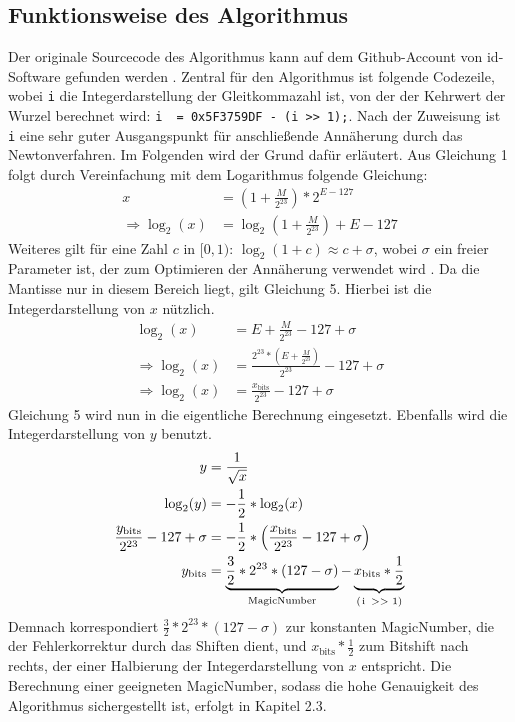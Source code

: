 \documentclass[course=erap]{aspdoc}
\begin{document}
\subsection{Funktionsweise des Algorithmus}
Der originale Sourcecode des Algorithmus kann auf dem Github-Account von id-Software gefunden werden \cite{qsqrt}. Zentral für den Algorithmus ist folgende Codezeile, wobei \lstinline{i} die Integerdarstellung der Gleitkommazahl ist, von der der Kehrwert der Wurzel berechnet wird: \lstinline{i  = 0x5F3759DF - (i >> 1);}. Nach der Zuweisung ist \lstinline{i} eine sehr guter Ausgangspunkt für anschließende Annäherung durch das Newtonverfahren. Im Folgenden wird der Grund dafür erläutert. Aus Gleichung 1 folgt durch Vereinfachung mit dem Logarithmus folgende Gleichung:
\begin{align}
    x &= \left(1+\frac{M}{2^{23}}\right)*2^{E-127} \nonumber\\
    \Rightarrow \log_2(x) &= \log_2\left(1+\frac{M}{2^{23}}\right)+ E-127
\end{align}
Weiteres gilt für eine Zahl $c$ in $[0, 1)$: $\log_2(1+c) \approx c + \sigma$, wobei $\sigma$ ein freier Parameter ist, der zum Optimieren der Annäherung verwendet wird \cite{McEniry}. Da die Mantisse nur in diesem Bereich liegt, gilt Gleichung 5. Hierbei ist die Integerdarstellung von $x$ nützlich.
\begin{align}
    \log_2(x) &= E+\frac{M}{2^{23}} -127 + \sigma \nonumber\\
    \Rightarrow \log_2(x) &= \frac{2^{23}*\left(E+\frac{M}{2^{23}}\right)}{2^{23}} -127 + \sigma \nonumber \\
    \Rightarrow \log_2(x) &= \frac{x_{\text{bits}}}{2^{23}} - 127 + \sigma
\end{align}
Gleichung 5 wird nun in die eigentliche Berechnung eingesetzt. Ebenfalls wird die Integerdarstellung von \(y\) benutzt.
\begin{align}
    y &= \frac{1}{\sqrt{x}} \nonumber\\
    \log_2(y) &= -\frac{1}{2}*\log_2(x) \nonumber\\
    \frac{y_{\text{bits}}}{2^{23}} - 127 + \sigma &= -\frac{1}{2}*\left(\frac{x_{\text{bits}}}{2^{23}} - 127 + \sigma \right) \nonumber\\
    y_{\text{bits}} &= \underbrace{\frac{3}{2}*2^{23}*(127-\sigma)}_{\text{MagicNumber}} - \underbrace{x_{\text{bits}}*\frac{1}{2}}_{\text{\lstinline{(i >> 1)}}}
\end{align}
Demnach korrespondiert \(\frac{3}{2}*2^{23}*(127-\sigma)\) zur konstanten MagicNumber, die der Fehlerkorrektur durch das Shiften dient, und \(x_{\text{bits}}*\frac{1}{2}\) zum Bitshift nach rechts, der einer Halbierung der Integerdarstellung von \(x\) entspricht. Die Berechnung einer geeigneten MagicNumber, sodass die hohe Genauigkeit des Algorithmus sichergestellt ist, erfolgt in Kapitel 2.3. \par
\end{document}
